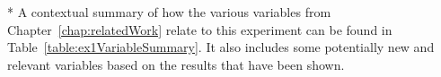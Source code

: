 * A contextual summary of how the various variables from Chapter~\ref{chap:relatedWork} relate to this experiment can be found in Table~\ref{table:ex1VariableSummary}. It also includes some potentially new and relevant variables based on the results that have been shown. 